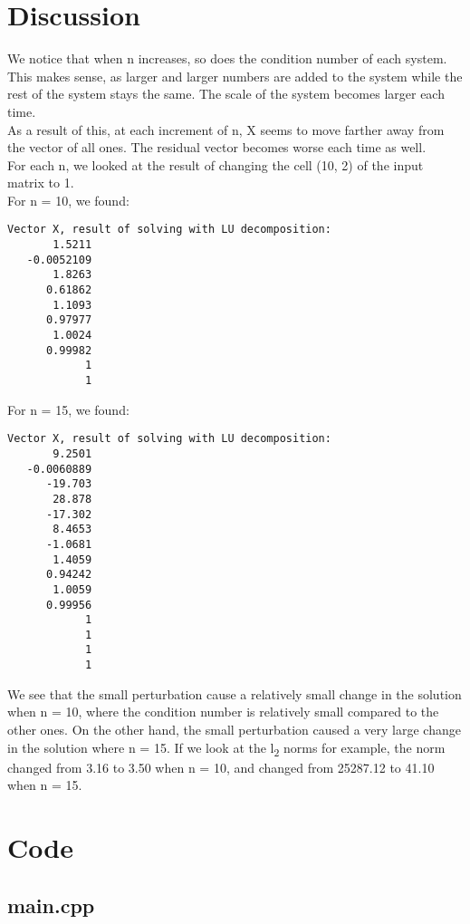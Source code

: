 \documentclass[11pt, a4paper, titlepage, openright]{article}
\begin{document}
\newpage
\section{Discussion}
We notice that when n increases, so does the condition number of each system.
This makes sense, as larger and larger numbers are added to the system while the rest of the system stays the same.
The scale of the system becomes larger each time.\\
As a result of this, at each increment of n, X seems to move farther away from the vector of all ones. The residual vector becomes worse each time as well.\\

For each n, we looked at the result of changing the cell (10, 2) of the input matrix to 1. \\
For n = 10, we found:
\begin{lstlisting}
Vector X, result of solving with LU decomposition:
       1.5211
   -0.0052109
       1.8263
      0.61862
       1.1093
      0.97977
       1.0024
      0.99982
            1
            1
\end{lstlisting}

For n = 15, we found:
\begin{lstlisting}
Vector X, result of solving with LU decomposition:
       9.2501
   -0.0060889
      -19.703
       28.878
      -17.302
       8.4653
      -1.0681
       1.4059
      0.94242
       1.0059
      0.99956
            1
            1
            1
            1
\end{lstlisting}

We see that the small perturbation cause a relatively small change in the solution when n = 10, where the condition number is relatively small compared to the other ones.
On the other hand, the small perturbation caused a very large change in the solution where n = 15.
If we look at the l\textsubscript{2} norms for example, the norm changed from 3.16 to 3.50 when n = 10, and changed from 25287.12 to 41.10 when n = 15.

\onecolumn
\appendix
\appendixpage
\addappheadtotoc

\section{Code}
	\subsection{main.cpp}
		 
	\bigskip
\end{document}
